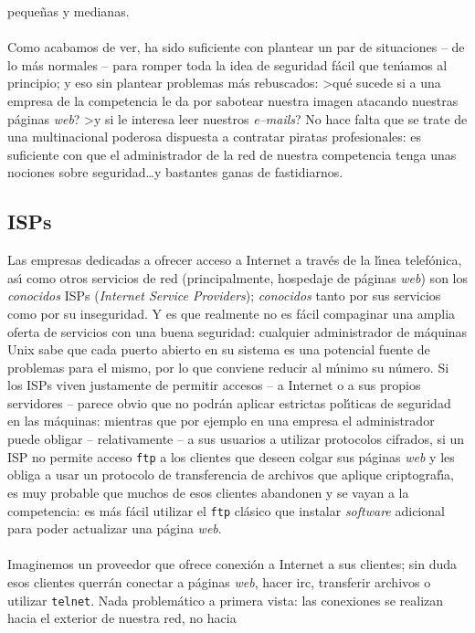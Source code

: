 peque\~nas y medianas.\\
\\Como acabamos de ver, ha sido suficiente con plantear un par de situaciones
-- de lo m\'as normales -- para romper toda la idea de seguridad f\'acil que
ten\'{\i}amos al principio; y eso sin plantear problemas m\'as rebuscados: 
>qu\'e sucede si a una empresa de la competencia le da por sabotear nuestra
imagen atacando nuestras p\'aginas {\it web}? >y si le interesa leer nuestros
{\it e--mails}? No hace falta que se trate de una multinacional poderosa 
dispuesta a contratar piratas profesionales: es suficiente con que el 
administrador de la red de nuestra competencia tenga unas nociones sobre 
seguridad\ldots y bastantes ganas de fastidiarnos.
\subsection{ISPs}
Las empresas dedicadas a ofrecer acceso a Internet a trav\'es de la l\'{\i}nea
telef\'onica, as\'{\i} como otros servicios de red (principalmente, hospedaje 
de p\'aginas {\it web}) son los {\it conocidos} ISPs ({\it Internet Service 
Providers}); {\it conocidos} tanto por sus
servicios como por su inseguridad. Y es que realmente no es f\'acil compaginar
una amplia oferta de servicios con una buena seguridad: cualquier administrador 
de m\'aquinas Unix sabe que cada puerto abierto en su sistema es una 
potencial fuente de problemas para el mismo, por lo que conviene reducir al
m\'{\i}nimo su n\'umero. Si los ISPs viven justamente de permitir accesos -- a
Internet o a sus propios servidores -- parece obvio que no podr\'an aplicar
estrictas pol\'{\i}ticas de seguridad en las m\'aquinas: mientras que por
ejemplo en una empresa el administrador puede obligar -- relativamente -- a sus 
usuarios a utilizar protocolos cifrados, si un ISP no permite acceso {\tt ftp}
a los clientes que deseen colgar sus p\'aginas {\it web} y les obliga a usar
un protocolo de transferencia de archivos que aplique criptograf\'{\i}a, es
muy probable que muchos de esos clientes abandonen y se vayan a la competencia:
es m\'as f\'acil utilizar el {\tt ftp} cl\'asico que instalar {\it software}
adicional para poder actualizar una p\'agina {\it web}.\\
\\Imaginemos un proveedor que ofrece conexi\'on a Internet a sus clientes; sin
duda esos clientes querr\'an conectar a p\'aginas {\it web}, hacer {\sc irc},
transferir archivos o utilizar {\tt telnet}. Nada problem\'atico a primera
vista: las conexiones se realizan hacia el exterior de nuestra red, no hacia

